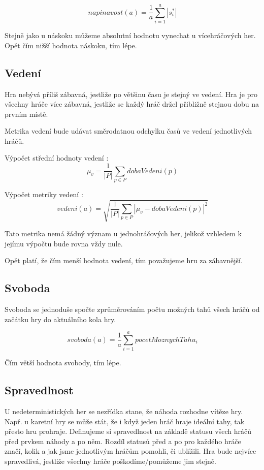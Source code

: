 	\[
	napinavost(a) = \frac{1}{a}\sum_{i=1}^a{|s^*_i|}
\]

Stejně jako u náskoku můžeme absolutní hodnotu vynechat u vícehráčových her. Opět čím nižší hodnota náskoku, tím lépe.

\subsection{Vedení}

Hra nebývá příliš zábavná, jestliže po většinu času je stejný ve vedení. Hra je pro všechny hráče více zábavná, jestliže se každý hráč držel přibližně stejnou dobu na prvním místě.

Metrika vedení bude udávat směrodatnou odchylku časů ve vedení jednotlivých hráčů.

Výpočet střední hodnoty vedení :
	\[
	\mu_v = \frac{1}{|P|}\sum_{p \in P} dobaVedeni(p)
\]

Výpočet metriky vedení :
	\[
	vedeni(a) = \sqrt{\frac{1}{|P|}\sum_{p \in P} |\mu_v - dobaVedeni(p)|^2}
\]

Tato metrika nemá žádný význam u jednohráčových her, jelikož vzhledem k jejímu výpočtu bude rovna vždy nule.

Opět platí, že čím menší hodnota vedení, tím považujeme hru za zábavnější.

\subsection{Svoboda}

Svoboda se jednoduše spočte zprůměrováním počtu možných tahů všech hráčů od začátku hry do aktuálního kola hry.

\[
	svoboda(a) = \frac{1}{a}\sum_{i=1}^a{pocetMoznychTahu_i}
\]

Čím větší hodnota svobody, tím lépe.

\subsection{Spravedlnost}

U nedeterministických her se nezřídka stane, že náhoda rozhodne vítěze hry. Např. u karetní hry se může stát, že i když jeden hráč hraje ideální tahy, tak přesto hru prohraje. Definujeme si spravedlnost na základě statusu všech hráčů před prvkem náhody a po něm. Rozdíl statusů před a po pro každého hráče značí, kolik a jak jsme jednotlivým hráčům pomohli, či ublížili. Hra bude nejvíce spravedlivá, jestliže všechny hráče poškodíme/pomůžeme jim stejně.

